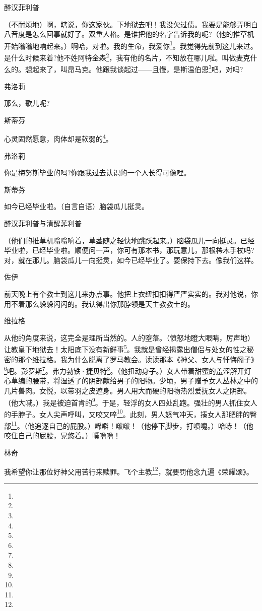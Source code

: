 \par 醉汉菲利普
\par （不耐烦地）啊，瞎说，你这家伙。下地狱去吧！我没欠过债。我要是能够弄明白八音度是怎么回事就好了。双重人格。是谁把他的名字告诉我的呢?（他的推草机开始嗡嗡地响起来。）啊哈，对啦。我的生命，我爱你\footnote{}。我觉得先前到这儿来过。是什么时候来着?他不姓阿特金森\footnote{}，我有他的名片，不知放在哪儿啦。叫做麦克什么的。想起来了，叫昂马克。他跟我谈起过——且慢，是斯温伯恩\footnote{}吧，对吗?
\par 弗洛莉
\par 那么，歌儿呢?
\par 斯蒂芬
\par 心灵固然愿意，肉体却是软弱的\footnote{}。
\par 弗洛莉
\par 你是梅努斯毕业的吗?你跟我过去认识的一个人长得可像哩。
\par 斯蒂芬
\par 如今已经毕业啦。（自言自语）脑袋瓜儿挺灵。
\par 醉汉菲利普与清醒菲利普
\par （他们的推草机嗡嗡响着，草茎随之轻快地跳跃起来。）脑袋瓜儿一向挺灵。已经毕业啦，已经毕业啦。顺便问一声，你可有那本书，那玩意儿，那根梣木手杖吗?对，就在那儿。脑袋瓜儿一向挺灵，如今已经毕业了。要保持下去。像我们这样。
\par 佐伊
\par 前天晚上有个教士到这儿来办点事。他把上衣纽扣扣得严严实实的。我对他说，你用不着那么躲躲闪闪的。我认得出你那脖领是天主教教士的。
\par 维拉格
\par 从他的角度来说，这完全是理所当然的。人的堕落。（愤怒地瞪大眼睛，厉声地）让教皇下地狱去！太阳底下没有新鲜事\footnote{}。我就是曾经揭露出僧侣与处女的性之秘密的那个维拉格。我为什么脱离了罗马教会。读读那本《神父、女人与忏悔阁子》\footnote{}吧。彭罗斯\footnote{}。弗力勃铁·捷贝特\footnote{}。（他扭动身子。）女人带着甜蜜的羞涩解开灯心草编的腰带，将湿透了的阴部献给男子的阳物。少顷，男子赠予女人丛林之中的几片兽肉。女悦，以带羽之皮遮身。男人用大而硬的阳物热烈爱抚女人之阴部。（他大喊。）我是被迫首肯的\footnote{}。于是，轻浮的女人四处乱跑。强壮的男人抓住女人的手脖子。女人尖声呼叫，又咬又啐\footnote{}。此刻，男人怒气冲天，揍女人那肥胖的臀部\footnote{}。（他追逐自己的屁股。）唏噼！啵啵！（他停下脚步，打喷嚏。）哈哧！（他咬住自己的屁股，晃悠着。）噗噜噜！
\par 林奇
\par 我希望你让那位好神父用苦行来赎罪。飞个主教\footnote{}，就要罚他念九遍《荣耀颂》。
